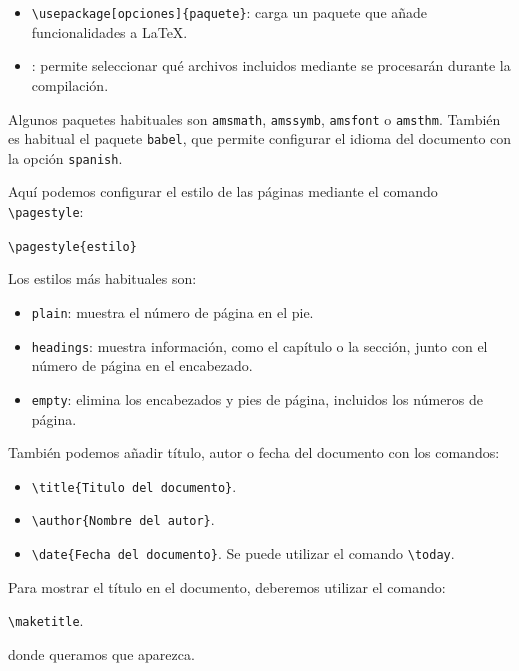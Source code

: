 \documentclass[11pt,a4paper]{article}
\theoremstyle{exercise}
\begin{document}
\begin{itemize}
    \item \verb|\usepackage[opciones]{paquete}|: carga un paquete que añade funcionalidades a \LaTeX.
    \item \verb||: permite seleccionar qué archivos incluidos mediante \verb|| se procesarán durante la compilación.
\end{itemize}

\noindent Algunos paquetes habituales son \texttt{amsmath}, \texttt{amssymb}, \texttt{amsfont} o \texttt{amsthm}. También es habitual el paquete \texttt{babel}, que permite configurar el idioma del documento con la opción \texttt{spanish}.

\medskip

Aquí podemos configurar el estilo de las páginas mediante
el comando \verb|\pagestyle|:

\begin{center}
    \verb|\pagestyle{estilo}|
\end{center}

Los estilos más habituales son:

\begin{itemize}
    \item \verb|plain|: muestra el número de página en el pie.
    \item \verb|headings|: muestra información, como el capítulo
    o la sección, junto con el número de página en el encabezado.
    \item \verb|empty|: elimina los encabezados y pies de página,
    incluidos los números de página.
\end{itemize}

También podemos añadir título, autor o fecha del documento con los comandos:


\begin{itemize}
    \item \verb|\title{Titulo del documento}|.
	\item \verb|\author{Nombre del autor}|.
	\item \verb|\date{Fecha del documento}|. Se puede utilizar el comando \verb|\today|.
\end{itemize}

\noindent Para mostrar el título en el documento, deberemos utilizar el comando:
\begin{center}
	\verb|\maketitle|.
\end{center}
donde queramos que aparezca.
\end{document}
